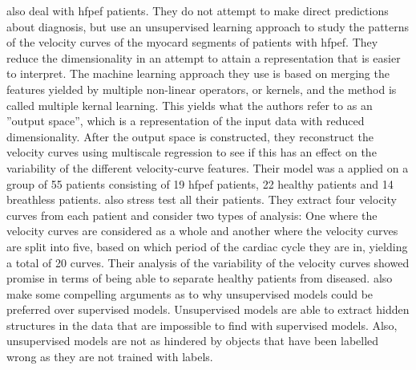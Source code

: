 \textcite{myocardial_motion_pattern} also deal with \acrshort{hfpef} patients. They do not attempt to make direct predictions about diagnosis, but use an unsupervised learning approach to study the patterns of the velocity curves of the myocard segments of patients with \acrshort{hfpef}. They reduce the dimensionality in an attempt to attain a representation that is easier to interpret. The machine learning approach they use is based on merging the features yielded by multiple non-linear operators, or kernels, and the method is called multiple kernal learning. This yields what the authors refer to as an ''output space'', which is a representation of the input data with reduced dimensionality. After the output space is constructed, they reconstruct the velocity curves using multiscale regression to see if this has an effect on the variability of the different velocity-curve features. Their model was a applied on a group of 55 patients consisting of 19 \acrshort{hfpef} patients, 22 healthy patients and 14 breathless patients. \textcite{myocardial_motion_pattern} also stress test all their patients. They extract four velocity curves from each patient and consider two types of analysis: One where the velocity curves are considered as a whole and another where the velocity curves are split into five, based on which period of the cardiac cycle they are in, yielding a total of 20 curves. Their analysis of the variability of the velocity curves showed promise in terms of being able to separate healthy patients from diseased. \textcite{myocardial_motion_pattern} also make some compelling arguments as to why unsupervised models could be preferred over supervised models. Unsupervised models are able to extract hidden structures in the data that are impossible to find with supervised models. Also, unsupervised models are not as hindered by objects that have been labelled wrong as they are not trained with labels. \bigskip

